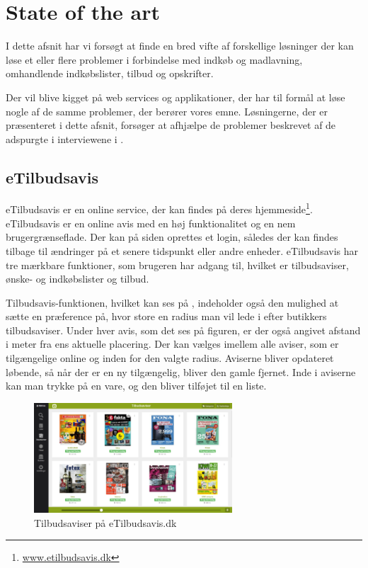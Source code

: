 \section{State of the art}
I dette afsnit har vi forsøgt at finde en bred vifte af forskellige løsninger der kan løse et eller flere problemer i forbindelse med indkøb og madlavning, omhandlende indkøbslister, tilbud og opskrifter.

Der vil blive kigget på web services og applikationer, der har til formål at løse nogle af de samme problemer, der berører vores emne.
Løsningerne, der er præsenteret i dette afsnit, forsøger at afhjælpe de problemer beskrevet af de adspurgte i interviewene i .

\subsection{eTilbudsavis}
eTilbudsavis er en online service, der kan findes på deres hjemmeside\footnote{\underline{www.etilbudsavis.dk}}. eTilbudsavis er en online avis med en høj funktionalitet og en nem brugergrænseflade.
Der kan på siden oprettes et login, således der kan findes tilbage til ændringer på et senere tidspunkt eller andre enheder.
eTilbudsavis har tre mærkbare funktioner, som brugeren har adgang til, hvilket er tilbudsaviser, ønske- og indkøbslister og tilbud.

Tilbudsavis-funktionen, hvilket kan ses på , indeholder også den mulighed at sætte en præference på, hvor store en radius man vil lede i efter butikkers tilbudsaviser.
Under hver avis, som det ses på figuren, er der også angivet afstand i meter fra ens aktuelle placering.
Der kan vælges imellem alle aviser, som er tilgængelige online og inden for den valgte radius.
Aviserne bliver opdateret løbende, så når der er en ny tilgængelig, bliver den gamle fjernet.
Inde i aviserne kan man trykke på en vare, og den bliver tilføjet til en liste.

\begin{figure}
\vspace{-20pt}
	\begin{center}
		\includegraphics[width=0.66\textwidth]{images/Images/eTilbudsavis.PNG}
	\end{center}
	\vspace{-20pt}
	\caption{Tilbudsaviser på eTilbudsavis.dk}\label{ss:eTilbudsavis}
	\vspace{-20pt}
\end{figure}

